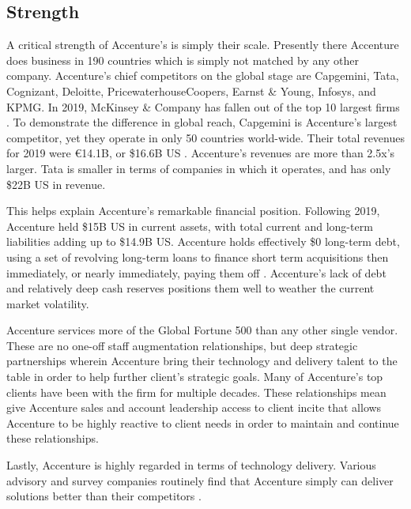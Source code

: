 \subsection{Strength}

A critical strength of Accenture's is simply their scale. Presently there Accenture does business in 190 countries \parencite{AccenturePLC2019} which is simply not matched by any other company. Accenture's chief competitors on the global stage are Capgemini, Tata, Cognizant, Deloitte, PricewaterhouseCoopers, Earnst \& Young, Infosys, and KPMG. In 2019, McKinsey \& Company has fallen out of the top 10 largest firms \parencite{consulting.comTop50Consulting}. To demonstrate the difference in global reach, Capgemini is Accenture's largest competitor, yet they operate in only 50 countries world-wide. Their total revenues for 2019 were \euro{}14.1B, or \$16.6B US \parencite{capgeminiFY2019Results2020}. Accenture's revenues are more than 2.5x's larger. Tata is smaller in terms of companies in which it operates, and has only \$22B US in revenue.

This helps explain Accenture's remarkable financial position. Following 2019, Accenture held \$15B US in current assets, with total current and long-term liabilities adding up to \$14.9B US.  Accenture holds effectively \$0 long-term debt, using a set of revolving long-term loans to finance short term acquisitions then immediately, or nearly immediately, paying them off \parencite{AccenturePLC2019}. Accenture's lack of debt and relatively deep cash reserves positions them well to weather the current market volatility.

Accenture services more of the Global Fortune 500 than any other single vendor. These are no one-off staff augmentation relationships, but deep strategic partnerships wherein Accenture bring their technology and delivery talent to the table in order to help further client's strategic goals. Many of Accenture's top clients have been with the firm for multiple decades. These relationships mean give Accenture sales and account leadership access to client incite that allows Accenture to be highly reactive to client needs in order to maintain and continue these relationships.

Lastly, Accenture is highly regarded in terms of technology delivery. Various advisory and survey companies routinely find that Accenture simply can deliver solutions better than their competitors \parencite[for example see][]{forresterresearchNowTechSAP}.

